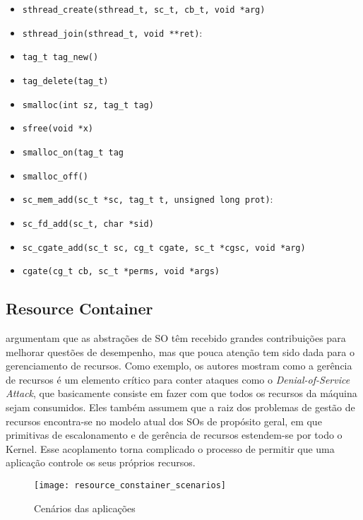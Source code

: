\begin{itemize}
  \item \texttt{sthread\_create(sthread\_t, sc\_t, cb\_t, void *arg)}
  \item \texttt{sthread\_join(sthread\_t, void **ret)}:
  \item \texttt{tag\_t tag\_new()}
  \item \texttt{tag\_delete(tag\_t)}
  \item \texttt{smalloc(int sz, tag\_t tag)}
  \item \texttt{sfree(void *x)}
  \item \texttt{smalloc\_on(tag\_t tag}
  \item \texttt{smalloc\_off()}
  \item \texttt{sc\_mem\_add(sc\_t *sc, tag\_t t, unsigned long prot)}:
  \item \texttt{sc\_fd\_add(sc\_t, char *sid)}
  \item \texttt{sc\_cgate\_add(sc\_t sc, cg\_t cgate, sc\_t *cgsc, void *arg)}
  \item \texttt{cgate(cg\_t cb, sc\_t *perms, void *args)}
\end{itemize}


\subsection{Resource Container}
\label{sec:rc}

\citet{resourcecontainers} argumentam que as abstrações de SO têm recebido
grandes contribuições para melhorar questões de desempenho, mas que
pouca atenção tem sido dada para o gerenciamento de recursos. Como exemplo, os
autores mostram como a gerência de recursos é um elemento crítico para conter
ataques como o \emph{Denial-of-Service Attack}, que basicamente consiste em fazer
com que todos os recursos da máquina sejam consumidos. Eles também
assumem que a raiz dos problemas de gestão de
recursos encontra-se no modelo atual dos SOs de propósito geral, em
que primitivas de escalonamento e de gerência de recursos estendem-se por todo
o Kernel. Esse acoplamento torna complicado o processo de permitir que uma
aplicação controle os seus próprios recursos.

\begin{figure}[!h]
  \centering
  \texttt{[image: resource\_constainer\_scenarios]} 
  \caption{Cenários das aplicações}
  \label{fig:resource_constainer_scenarios}
\end{figure}

